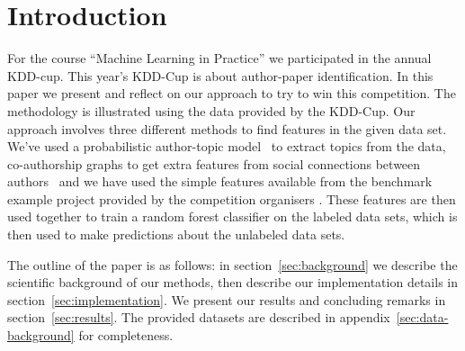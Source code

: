 \section{Introduction}

For the course ``Machine Learning in Practice'' we participated in the annual KDD-cup.
This year's KDD-Cup is about author-paper identification.
In this paper we present and reflect on our approach to try to win this competition.
The methodology is illustrated using the data provided by the KDD-Cup.
Our approach involves three different methods to find features in the given data set.
We've used a probabilistic author-topic model~\cite{steyvers2004probabilistic} to extract topics from  the data, co-authorship graphs to get extra features from social connections between authors~\cite{liu2005co} and we have used the simple features available from the benchmark example project provided by the competition organisers \cite{kddcupsite}.
These features are then used together to train a random forest classifier on the labeled data sets, which is then used to make predictions about the unlabeled data sets.

The outline of the paper is as follows: in section~\ref{sec:background} we describe the scientific background of our methods, then describe our implementation details in section~\ref{sec:implementation}.
We present our results and concluding remarks in section~\ref{sec:results}.
The provided datasets are described in appendix~\ref{sec:data-background} for completeness.

